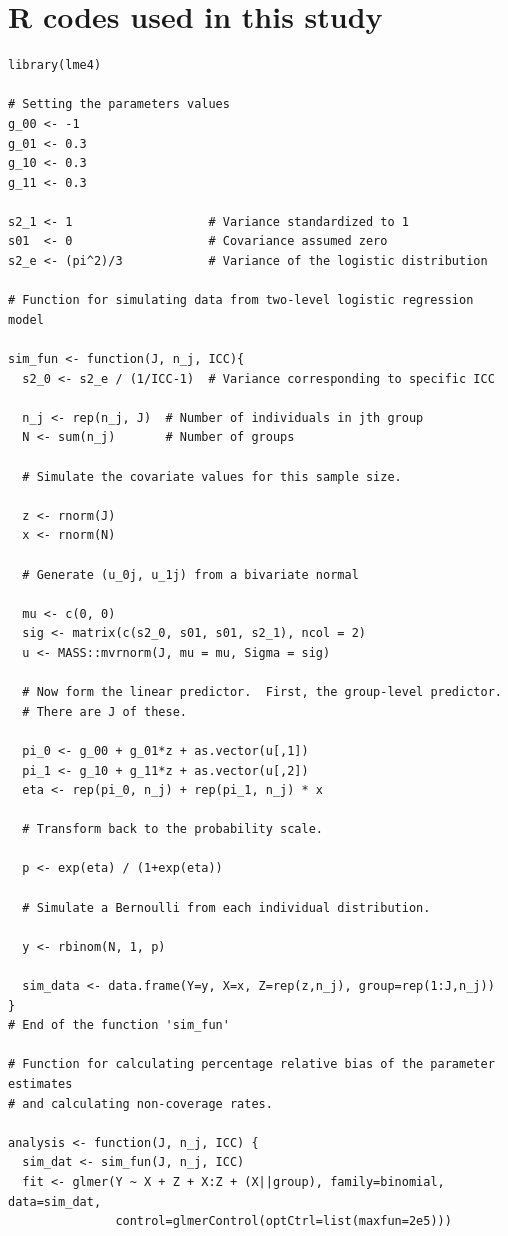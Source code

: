 \documentclass[12pt,oneside,a4paper]{reedthesis}
\begin{document}
\hypertarget{r-codes-used-in-this-study}{%
\chapter{R codes used in this study}\label{r-codes-used-in-this-study}}

\small
\begin{verbatim}
library(lme4)

# Setting the parameters values
g_00 <- -1
g_01 <- 0.3
g_10 <- 0.3
g_11 <- 0.3

s2_1 <- 1                   # Variance standardized to 1
s01  <- 0                   # Covariance assumed zero
s2_e <- (pi^2)/3            # Variance of the logistic distribution

# Function for simulating data from two-level logistic regression model

sim_fun <- function(J, n_j, ICC){
  s2_0 <- s2_e / (1/ICC-1)  # Variance corresponding to specific ICC
  
  n_j <- rep(n_j, J)  # Number of individuals in jth group
  N <- sum(n_j)       # Number of groups
  
  # Simulate the covariate values for this sample size.
  
  z <- rnorm(J)
  x <- rnorm(N)
  
  # Generate (u_0j, u_1j) from a bivariate normal 
  
  mu <- c(0, 0)
  sig <- matrix(c(s2_0, s01, s01, s2_1), ncol = 2)
  u <- MASS::mvrnorm(J, mu = mu, Sigma = sig)
  
  # Now form the linear predictor.  First, the group-level predictor. 
  # There are J of these.
  
  pi_0 <- g_00 + g_01*z + as.vector(u[,1])
  pi_1 <- g_10 + g_11*z + as.vector(u[,2])
  eta <- rep(pi_0, n_j) + rep(pi_1, n_j) * x
  
  # Transform back to the probability scale.
  
  p <- exp(eta) / (1+exp(eta))
  
  # Simulate a Bernoulli from each individual distribution.
  
  y <- rbinom(N, 1, p)
  
  sim_data <- data.frame(Y=y, X=x, Z=rep(z,n_j), group=rep(1:J,n_j))
}
# End of the function 'sim_fun'

# Function for calculating percentage relative bias of the parameter estimates
# and calculating non-coverage rates.

analysis <- function(J, n_j, ICC) {
  sim_dat <- sim_fun(J, n_j, ICC)
  fit <- glmer(Y ~ X + Z + X:Z + (X||group), family=binomial, data=sim_dat,
               control=glmerControl(optCtrl=list(maxfun=2e5)))
  

\end{verbatim}
\end{document}
